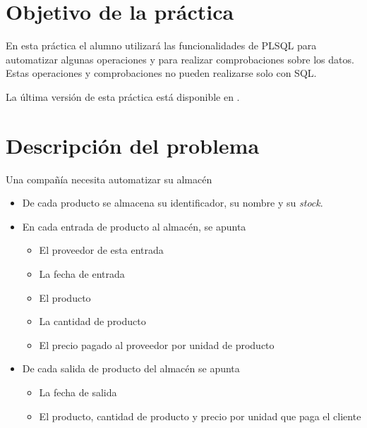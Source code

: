 
\usepackage{needspace}




\renewcommand{\hmwkTitle}{Práctica PLSQL}
\renewcommand{\hmwkClass}{Gestión de Bases de datos}







\primerapagina


\section{Objetivo de la práctica}
En esta práctica el alumno utilizará las funcionalidades de PLSQL para automatizar algunas operaciones y para realizar comprobaciones sobre los datos. Estas operaciones y comprobaciones no pueden realizarse solo con SQL.

La última versión de esta práctica está disponible en .


\section{Descripción del problema}
Una compañía necesita automatizar su almacén
\begin{itemize}
\item De cada producto se almacena su identificador, su nombre y su \textit{stock}.
\item En cada entrada de producto al almacén, se apunta
  \begin{itemize}
  \item El proveedor de esta entrada
  \item La fecha de entrada
  \item El producto
  \item La cantidad de producto
  \item El precio pagado al proveedor por unidad de producto
  \end{itemize}
\item De cada salida de producto del almacén se apunta
  \begin{itemize}
  \item La fecha de salida
  \item El producto, cantidad de producto y precio por unidad que paga el cliente
  \end{itemize}
\end{itemize}




